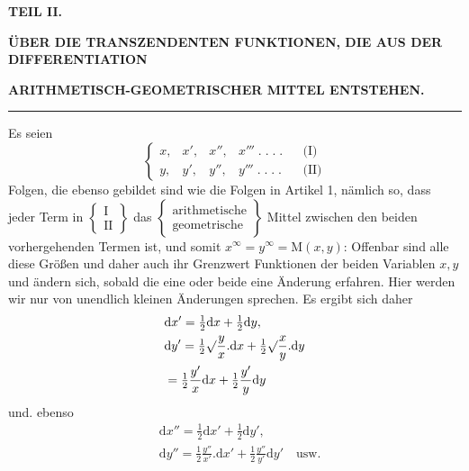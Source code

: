 \begingroup
\renewcommand{\arraystretch}{1.45}
\clearpage{}
\begin{center}
\textbf{TEIL II.}\par
\textbf{ÜBER DIE TRANSZENDENTEN FUNKTIONEN, DIE AUS DER DIFFERENTIATION}\par
\textbf{ARITHMETISCH-GEOMETRISCHER MITTEL ENTSTEHEN.}
\end{center}
\par\begin{center}\rule{.15\linewidth}{.4pt}\end{center}
Es seien
\[
\left\{\begin{array}{llllll}
x,&x',&x'',&x'''\; .\; .\; .\; .&&\text{(I)}\\[6pt]
y,&y',&y'',&y'''\; .\; .\; .\; .&&\text{(II)}
\end{array}\right.
\]
Folgen, die ebenso gebildet sind wie die Folgen in Artikel 1, nämlich so, dass jeder Term in
$\left\{\begin{array}{c}\mathrm{I}\\\mathrm{II}\end{array}\right\}$ das
$\left\{\begin{array}{c}\text{arithmetische}\\\text{geometrische}\end{array}\right\}$
Mittel zwischen den beiden vorhergehenden Termen ist, und somit $x^{\infty}=y^{\infty}=\mathrm{M}(x,y)$:
Offenbar sind alle diese Größen und daher auch ihr Grenzwert Funktionen
der beiden Variablen $x,y$ und ändern sich, sobald die eine oder beide
eine Änderung erfahren. Hier werden wir nur von unendlich kleinen Änderungen sprechen.
Es ergibt sich daher
\[
\begin{aligned}&\mathrm{d}x'=\tfrac12\mathrm{d}x+\tfrac12\mathrm{d}y,\\&
\mathrm{d}y'=\tfrac12\surd\frac{y}{x}. \mathrm{d}x
+\tfrac12\surd\frac{x}{y}. \mathrm{d}y\\&=\tfrac12\frac{y'}{x}\mathrm{d}x+\tfrac12\frac{y'}{y}\mathrm{d}y\end{aligned}
\]
und. ebenso
\[
\begin{aligned}&\mathrm{d}x''=\tfrac12\mathrm{d}x'+\tfrac12\mathrm{d}y',\\&
\mathrm{d}y''=\tfrac12\frac{y''}{x'}. \mathrm{d}x'
+\tfrac12\frac{y''}{y'}\mathrm{d}y'\quad\text{usw.}\end{aligned}
\]
